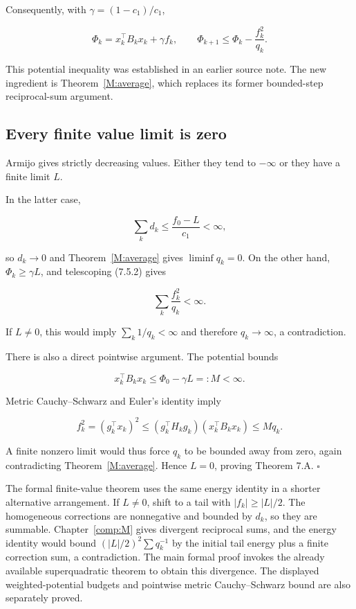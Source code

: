 Consequently, with \(\gamma=(1-c_1)/c_1\),

\[
\Phi_k=x_k^\top B_kx_k+\gamma f_k,
\qquad
\boxed{\Phi_{k+1}\le\Phi_k-\frac{f_k^2}{q_k}.}
\tag{7.5.2}
\]

This potential inequality was established in an earlier source note. The new
ingredient is Theorem~\ref{M:average}, which replaces its former bounded-step
reciprocal-sum argument.



\subsection{Every finite value limit is
zero}\label{H:every-finite-value-limit-is-zero}

Armijo gives strictly decreasing values. Either they tend to \(-\infty\)
or they have a finite limit \(L\).

In the latter case,

\[
\sum_k d_k\le\frac{f_0-L}{c_1}<\infty,
\]

so \(d_k\to0\) and Theorem~\ref{M:average} gives \(\liminf q_k=0\). On the other hand,
\(\Phi_k\ge\gamma L\), and telescoping (7.5.2) gives

\[
\sum_k\frac{f_k^2}{q_k}<\infty.
\]

If \(L\ne0\), this would imply \(\sum_k1/q_k<\infty\) and therefore
\(q_k\to\infty\), a contradiction.

There is also a direct pointwise argument. The potential bounds

\[
x_k^\top B_kx_k\le\Phi_0-\gamma L=:M<\infty.
\]

Metric Cauchy--Schwarz and Euler's identity imply

\[
f_k^2=(g_k^\top x_k)^2
\le(g_k^\top H_kg_k)(x_k^\top B_kx_k)
\le Mq_k.
\]

A finite nonzero limit would thus force \(q_k\) to be bounded away from
zero, again contradicting Theorem~\ref{M:average}. Hence \(L=0\), proving Theorem 7.A.
\(\square\)

The formal finite-value theorem uses the same energy identity in a shorter alternative arrangement. If \(L\ne0\), shift to a tail with \(|f_k|\ge|L|/2\). The homogeneous corrections are nonnegative and bounded by \(d_k\), so they are summable. Chapter~\ref{comp:M} gives divergent reciprocal sums, and the energy identity would bound \((|L|/2)^2\sum q_k^{-1}\) by the initial tail energy plus a finite correction sum, a contradiction. The main formal proof invokes the already available superquadratic theorem to obtain this divergence. The displayed weighted-potential budgets and pointwise metric Cauchy--Schwarz bound are also separately proved.

